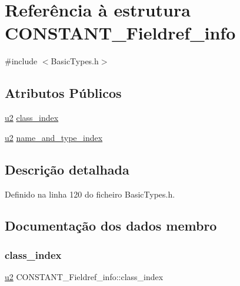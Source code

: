 \hypertarget{structCONSTANT__Fieldref__info}{}\section{Referência à estrutura C\+O\+N\+S\+T\+A\+N\+T\+\_\+\+Fieldref\+\_\+info}
\label{structCONSTANT__Fieldref__info}


{\ttfamily \#include $<$Basic\+Types.\+h$>$}

\subsection*{Atributos Públicos}
\begin{DoxyCompactItemize}
\item 
\hyperlink{BasicTypes_8h_a732cde1300aafb73b0ea6c2558a7a54f}{u2} \hyperlink{structCONSTANT__Fieldref__info_aab39f30321396337e533fd36ec23934c}{class\+\_\+index}
\item 
\hyperlink{BasicTypes_8h_a732cde1300aafb73b0ea6c2558a7a54f}{u2} \hyperlink{structCONSTANT__Fieldref__info_a9ccfe931ed030cef53ca1b079356fe31}{name\+\_\+and\+\_\+type\+\_\+index}
\end{DoxyCompactItemize}


\subsection{Descrição detalhada}


Definido na linha 120 do ficheiro Basic\+Types.\+h.



\subsection{Documentação dos dados membro}
\mbox{\label{structCONSTANT__Fieldref__info_aab39f30321396337e533fd36ec23934c}} 
\subsubsection{\texorpdfstring{class\+\_\+index}{class\_index}}
{\footnotesize\ttfamily \hyperlink{BasicTypes_8h_a732cde1300aafb73b0ea6c2558a7a54f}{u2} C\+O\+N\+S\+T\+A\+N\+T\+\_\+\+Fieldref\+\_\+info\+::class\+\_\+index}




